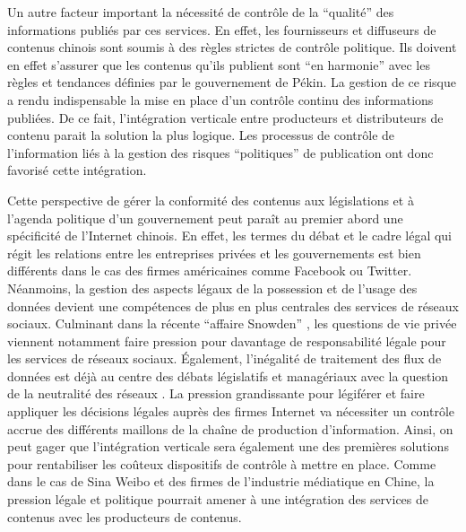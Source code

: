 Un autre facteur important la nécessité de contrôle de la ``qualité'' des informations publiés par ces services. En effet, les fournisseurs et diffuseurs de contenus chinois sont soumis à des règles strictes de contrôle politique. Ils doivent en effet s'assurer que les contenus qu'ils publient sont ``en harmonie'' avec les règles et tendances définies par le gouvernement de Pékin. La gestion de ce risque a rendu indispensable la mise en place d'un contrôle continu des informations publiées. De ce fait, l'intégration verticale entre producteurs et distributeurs de contenu parait la solution la plus logique. Les processus de contrôle de l'information liés à la gestion des risques ``politiques'' de publication ont donc favorisé cette intégration.



Cette perspective de gérer la conformité des contenus aux législations et à l'agenda politique d'un gouvernement peut paraît au premier abord une spécificité de l'Internet chinois. En effet, les termes du débat et le cadre légal qui régit les relations entre les entreprises privées et les gouvernements est bien différents dans le cas des firmes américaines comme Facebook ou Twitter. Néanmoins, la gestion des aspects légaux de la possession et de l'usage des données devient une compétences de plus en plus centrales des services de réseaux sociaux. Culminant dans la récente ``affaire Snowden'' \cite{Greenwald2013}, les questions de vie privée viennent notamment faire pression pour davantage de responsabilité légale pour les services de réseaux sociaux. Également, l'inégalité de traitement des flux de données est déjà au centre des débats législatifs et managériaux avec la question de la neutralité des réseaux \cite{Schafer2011}. La pression grandissante pour légiférer et faire appliquer les décisions légales auprès des firmes Internet va nécessiter un contrôle accrue des différents maillons de la chaîne de production d'information. Ainsi, on peut gager que l'intégration verticale sera également une des premières solutions pour rentabiliser les coûteux dispositifs de contrôle à mettre en place. Comme dans le cas de Sina Weibo et des firmes de l'industrie médiatique en Chine, la pression légale et politique pourrait amener à une intégration des services de contenus avec les producteurs de contenus.

